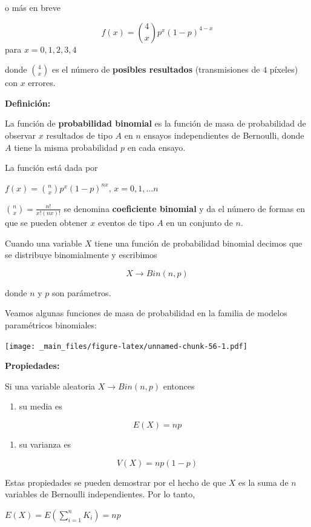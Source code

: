 \documentclass[
]{book}
\providecommand{\tightlist}{%
  \setlength{\itemsep}{0pt}\setlength{\parskip}{0pt}}
\begin{document}
o más en breve

\[f(x)=\binom 4 xp^x(1-p)^{4-x}\]
para \(x=0,1,2,3,4\)

donde \(\binom 4 x\) es el número de \textbf{posibles resultados} (transmisiones de \(4\) píxeles) con \(x\) errores.

\textbf{Definición:}

La función de \textbf{probabilidad binomial} es la función de masa de probabilidad de observar \(x\) resultados de tipo \(A\) en \(n\) ensayos independientes de Bernoulli, donde \(A\) tiene la misma probabilidad \(p\) en cada ensayo.

La función está dada por

\(f(x)=\binom nxp^x(1-p)^{nx}\), \(x=0,1,...n\)

\(\binom nx= \frac{n!}{x!(nx)!}\) se denomina \textbf{coeficiente binomial} y da el número de formas en que se pueden obtener \(x\) eventos de tipo \(A\) en un conjunto de \(n\).

Cuando una variable \(X\) tiene una función de probabilidad binomial decimos que se distribuye binomialmente y escribimos

\[X\rightarrow Bin(n,p)\]

donde \(n\) y \(p\) son parámetros.

Veamos algunas funciones de masa de probabilidad en la familia de modelos paramétricos binomiales:

\texttt{[image: \_main\_files/figure-latex/unnamed-chunk-56-1.pdf]}

\textbf{Propiedades:}

Si una variable aleatoria \(X\rightarrow Bin(n,p)\) entonces

\begin{enumerate}
\def\labelenumi{\arabic{enumi})}
\tightlist
\item
  su media es
\end{enumerate}

\[E(X)=np\]

\begin{enumerate}
\def\labelenumi{\arabic{enumi})}
\setcounter{enumi}{1}
\tightlist
\item
  su varianza es
\end{enumerate}

\[V(X)=np(1-p)\]

Estas propiedades se pueden demostrar por el hecho de que \(X\) es la suma de \(n\) variables de Bernoulli independientes. Por lo tanto,

\(E(X)=E(\sum_{i=1}^n K_i)=np\)
\end{document}
